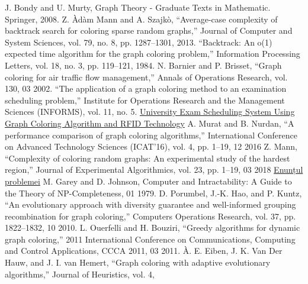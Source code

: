 \documentclass[runningheads]{paper}
\begin{document}
%
%
%
% 
% 
%
\begin{thebibliography}{8}

    J. Bondy and U. Murty, Graph Theory - Graduate Texts in Mathematic.
    Springer, 2008.
    Z. \`{A}d\`{a}m Mann and A. Szajk\`{o}, “Average-case complexity of backtrack
    search for coloring sparse random graphs,” Journal of Computer and
    System Sciences, vol. 79, no. 8, pp. 1287–1301, 2013.
    “Backtrack: An o(1) expected time algorithm for the graph coloring
    problem,” Information Processing Letters, vol. 18, no. 3, pp. 119–121,
    1984.
    N. Barnier and P. Brisset, “Graph coloring for air traffic flow management,” 
    Annals of Operations Research, vol. 130, 03 2002.
    “The application of a graph coloring method to an examination scheduling problem,” 
    Institute for Operations Research and the Management
    Sciences (INFORMS), vol. 11, no. 5.
    \href{http://www.ijimt.org/papers/359-D0129.pdf}{University Exam Scheduling System Using Graph
    Coloring Algorithm and RFID Technology}
    A. Murat and B. Nurdan, “A performance comparison of graph coloring algorithms,” 
    International Conference on Advanced Technology
    Sciences (ICAT’16), vol. 4, pp. 1–19, 12 2016
    Z. Mann, “Complexity of coloring random graphs: An experimental
    study of the hardest region,” Journal of Experimental Algorithmics,
    vol. 23, pp. 1–19, 03 2018
    \href{https://acs-aa-challenge.github.io/acs-aa-challenge/18-np-2-colouring/}{Enunțul problemei}
    M. Garey and D. Johnson, Computer and Intractability: A Guide to the
    Theory of NP-Completeness, 01 1979.
    D. Porumbel, J.-K. Hao, and P. Kuntz, “An evolutionary approach with
    diversity guarantee and well-informed grouping recombination for graph
    coloring,” Computers Operations Research, vol. 37, pp. 1822–1832, 10
    2010.
    L. Ouerfelli and H. Bouziri, “Greedy algorithms for dynamic graph coloring,” 2011 International Conference on Communications, Computing
    and Control Applications, CCCA 2011, 03 2011.
    \`{A}. E. Eiben, J. K. Van Der Hauw, and J. I. van Hemert, “Graph coloring
    with adaptive evolutionary algorithms,” Journal of Heuristics, vol. 4,

\end{thebibliography}
\end{document}
